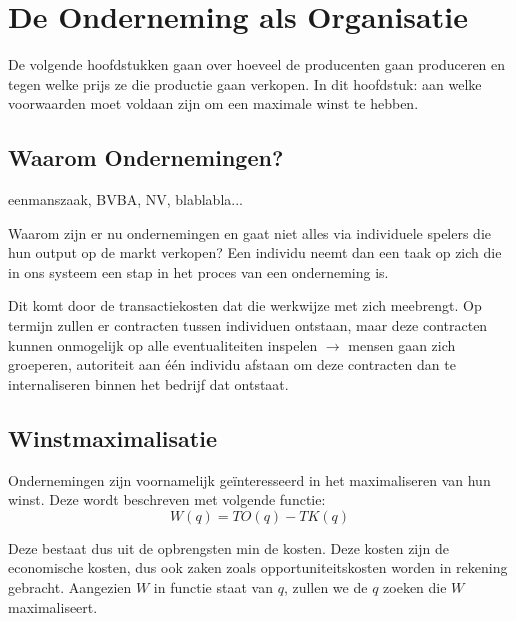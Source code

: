 \section{De Onderneming als Organisatie}
De volgende hoofdstukken gaan over hoeveel de producenten gaan produceren en tegen welke prijs ze die productie gaan verkopen. In dit hoofdstuk: aan welke voorwaarden moet voldaan zijn om een maximale winst te hebben.

\subsection{Waarom Ondernemingen?}
eenmanszaak, BVBA, NV, blablabla...

Waarom zijn er nu ondernemingen en gaat niet alles via individuele spelers die hun output op de markt verkopen? Een individu neemt dan een taak op zich die in ons systeem een stap in het proces van een onderneming is.

Dit komt door de transactiekosten dat die werkwijze met zich meebrengt. Op termijn zullen er contracten tussen individuen ontstaan, maar deze contracten kunnen onmogelijk op alle eventualiteiten inspelen $\rightarrow$ mensen gaan zich groeperen, autoriteit aan \'e\'en individu afstaan om deze contracten dan te internaliseren binnen het bedrijf dat ontstaat.

\subsection{Winstmaximalisatie}
Ondernemingen zijn voornamelijk ge\"interesseerd in het maximaliseren van hun winst. Deze wordt beschreven met volgende functie:
\begin{equation}
	W(q) = TO(q) - TK(q)
\end{equation}

Deze bestaat dus uit de opbrengsten min de kosten. Deze kosten zijn de economische kosten, dus ook zaken zoals opportuniteitskosten worden in rekening gebracht. Aangezien $W$ in functie staat van $q$, zullen we de $q$ zoeken die $W$ maximaliseert.

